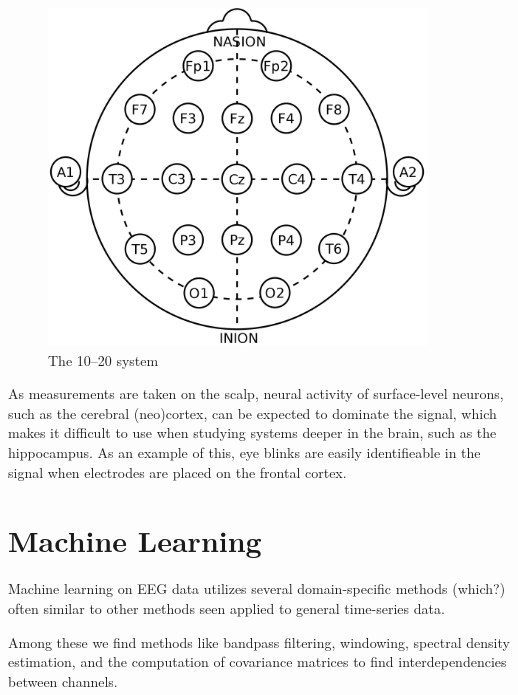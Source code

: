     \begin{figure}
        \begin{center}
            \includegraphics[width=10cm]{img/1020system.png}
        \end{center}
        \caption{The 10–20 system}\label{fig:1020}
    \end{figure}


    As measurements are taken on the scalp, neural activity of surface-level neurons, such as the cerebral (neo)cortex, can be expected to dominate the signal, which makes it difficult to use when studying systems deeper in the brain, such as the hippocampus. As an example of this, eye blinks are easily identifieable in the signal when electrodes are placed on the frontal cortex.



\section{Machine Learning}

    Machine learning on EEG data utilizes several domain-specific methods (which?) often similar to other methods seen applied to general time-series data.

    Among these we find methods like bandpass filtering, windowing, spectral density estimation, and the computation of covariance matrices to find interdependencies between channels.

